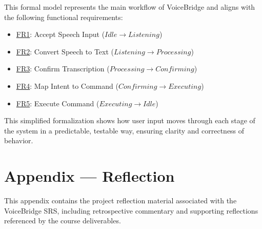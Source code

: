 \documentclass[11pt]{article}
\begin{document}
This formal model represents the main workflow of VoiceBridge and aligns with the following functional requirements:

\begin{itemize}
    \item \hyperref[fr:FR1]{FR1}: Accept Speech Input ($Idle \rightarrow Listening$)
    \item \hyperref[fr:FR2]{FR2}: Convert Speech to Text ($Listening \rightarrow Processing$)
    \item \hyperref[fr:FR3]{FR3}: Confirm Transcription ($Processing \rightarrow Confirming$)
    \item \hyperref[fr:FR4]{FR4}: Map Intent to Command ($Confirming \rightarrow Executing$)
    \item \hyperref[fr:FR5]{FR5}: Execute Command ($Executing \rightarrow Idle$)
\end{itemize}

This simplified formalization shows how user input moves through each stage of the system in a predictable, testable way, ensuring clarity and correctness of behavior.




\newpage{}
\section*{Appendix --- Reflection}
This appendix contains the project reflection material associated with the VoiceBridge SRS, including retrospective commentary and supporting reflections referenced by the course deliverables.




\end{document}
